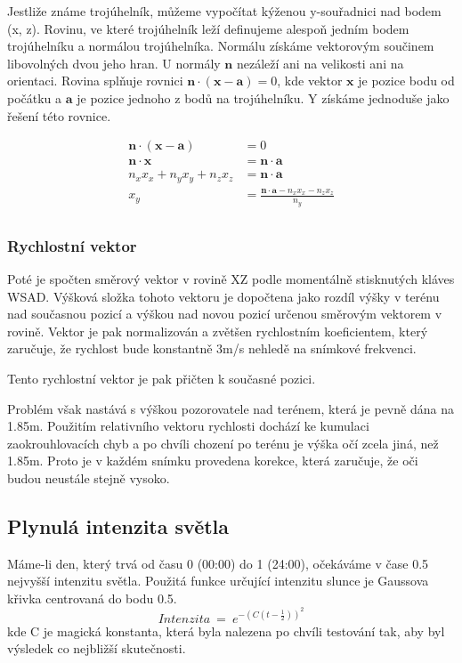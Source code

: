 \documentclass[11pt]{article}
\begin{document}
Jestliže známe trojúhelník, můžeme vypočítat kýženou y-souřadnici nad bodem (x,
z). Rovinu, ve které trojúhelník leží definujeme alespoň jedním bodem
trojúhelníku a normálou trojúhelníka. Normálu získáme vektorovým součinem
libovolných dvou jeho hran. U normály $\mathbf n$ nezáleží ani na velikosti ani
na orientaci. Rovina splňuje rovnici $\mathbf n \cdot (\mathbf x - \mathbf a) =
0$, kde vektor $\mathbf x$ je pozice bodu od počátku a $\mathbf a$ je pozice
jednoho z bodů na trojúhelníku. Y získáme jednoduše jako řešení této rovnice.

\begin{align*}
\mathbf n \cdot (\mathbf x - \mathbf a) &= 0 \\
\mathbf n \cdot \mathbf x &= \mathbf n \cdot \mathbf a \\
n_x x_x + n_y x_y + n_z x_z &= \mathbf n \cdot \mathbf a \\
x_y &= \frac{\mathbf n \cdot \mathbf a - n_x x_x - n_z x_z}{n_y} \\
\end{align*}

\subsubsection{Rychlostní vektor}
Poté je spočten směrový vektor v rovině XZ podle momentálně stisknutých
kláves WSAD. Výšková složka tohoto vektoru je dopočtena jako rozdíl výšky v
terénu nad současnou pozicí a výškou nad novou pozicí určenou směrovým vektorem
v rovině. Vektor je pak normalizován a zvětšen rychlostním koeficientem, který
zaručuje, že rychlost bude konstantně 3m/s nehledě na snímkové frekvenci.

Tento rychlostní vektor je pak přičten k současné pozici.

Problém však nastává s výškou pozorovatele nad terénem, která je pevně dána na
1.85m. Použitím relativního vektoru rychlosti dochází ke kumulaci
zaokrouhlovacích chyb a po chvíli chození po terénu je výška očí zcela jiná,
než 1.85m. Proto je v každém snímku provedena korekce, která zaručuje, že oči
budou neustále stejně vysoko.

\subsection{Plynulá intenzita světla}
Máme-li den, který trvá od času 0 (00:00) do 1 (24:00), očekáváme v čase 0.5
nejvyšší intenzitu světla. Použitá funkce určující intenzitu slunce je Gaussova
křivka centrovaná do bodu 0.5.
$$
Intenzita~=~e^{- (C(t - \frac{1}{2}))^2}
$$
kde C je magická konstanta, která byla nalezena po chvíli testování tak, aby
byl výsledek co nejbližší skutečnosti.
\end{document}
